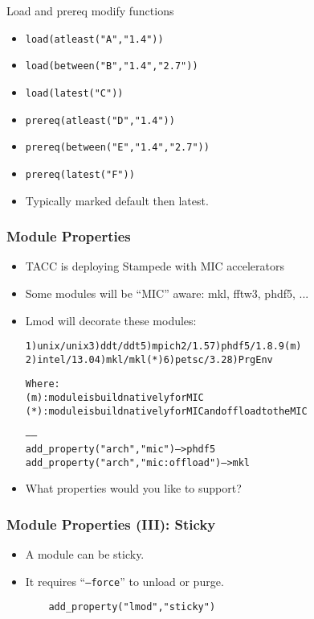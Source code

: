 \documentclass[dvipsnames,aspectratio=169]{beamer}
\begin{document}
\begin{frame}{Load and prereq modify functions}
  \begin{itemize}
    \item \texttt{load(atleast("A","1.4"))}
    \item \texttt{load(between("B","1.4","2.7"))}
    \item \texttt{load(latest("C"))}
    \item \texttt{prereq(atleast("D","1.4"))}
    \item \texttt{prereq(between("E","1.4","2.7"))}
    \item \texttt{prereq(latest("F"))}
    \item Typically marked default then latest.
  \end{itemize}
\end{frame}

\begin{frame}[fragile]
    \frametitle{Module Properties}
  \begin{itemize}
    \item TACC is deploying Stampede with MIC accelerators
    \item Some modules will be ``MIC'' aware: mkl, fftw3, phdf5, ...
    \item Lmod will decorate these modules:
  {\tiny
    \begin{alltt}
  1) unix/unix     3) ddt/ddt       5) mpich2/1.5    7) phdf5/1.8.9 {\color{blue}(m)}
  2) intel/13.0    4) mkl/mkl {\color{red}(*)}   6) petsc/3.2     8) PrgEnv

  Where:
   {\color{blue}(m)}:  module is build natively for MIC
   {\color{red}(*)}:  module is build natively for MIC and offload to the MIC

   ------
   add_property("arch","mic")              -- > phdf5
   add_property("arch","mic:offload")      -- > mkl
    \end{alltt}
}
  \item What properties would you like to support?
  \end{itemize}
\end{frame}


\begin{frame}[fragile]
    \frametitle{Module Properties (III): Sticky}
  \begin{itemize}
    \item A module can be sticky.
    \item It requires ``\texttt{--force}'' to unload or purge.
    {\small
\begin{verbatim}
    add_property("lmod","sticky")
\end{verbatim}
}
  \end{itemize}
\end{frame}
\end{document}
